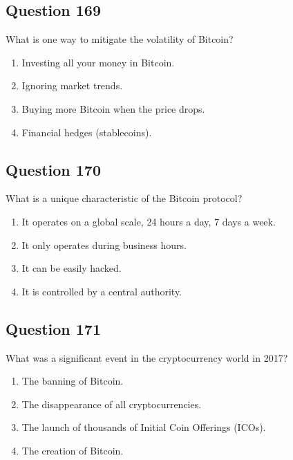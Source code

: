 \documentclass[12pt,a4paper]{article}
\begin{document}
\bigskip


\subsection*{Question 169}
What is one way to mitigate the volatility of Bitcoin?

\begin{enumerate}[label=\Alph*., leftmargin=*]
\item Investing all your money in Bitcoin.
\item Ignoring market trends.
\item Buying more Bitcoin when the price drops.
\item Financial hedges (stablecoins).
\end{enumerate}

\bigskip


\subsection*{Question 170}
What is a unique characteristic of the Bitcoin protocol?

\begin{enumerate}[label=\Alph*., leftmargin=*]
\item It operates on a global scale, 24 hours a day, 7 days a week.
\item It only operates during business hours.
\item It can be easily hacked.
\item It is controlled by a central authority.
\end{enumerate}

\bigskip


\subsection*{Question 171}
What was a significant event in the cryptocurrency world in 2017?

\begin{enumerate}[label=\Alph*., leftmargin=*]
\item The banning of Bitcoin.
\item The disappearance of all cryptocurrencies.
\item The launch of thousands of Initial Coin Offerings (ICOs).
\item The creation of Bitcoin.
\end{enumerate}

\bigskip
\end{document}
